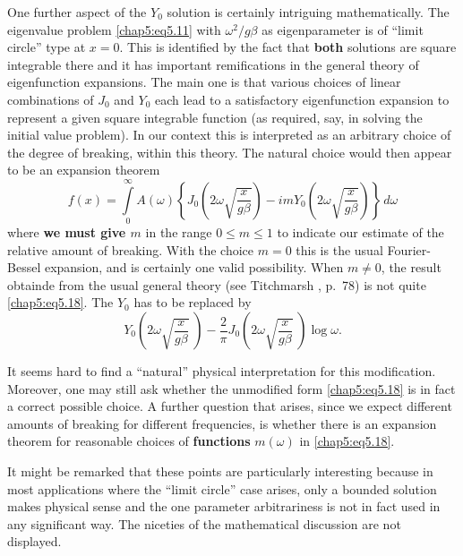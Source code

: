 One further aspect of the $Y_0$ solution is certainly intriguing mathematically. The eigenvalue problem \eqref{chap5:eq5.11} with $\omega^2/g\beta$ as eigenparameter is of ``limit circle'' type at $x=0$. This is identified by the fact that {\bf both} solutions are square integrable there and it has important remifications in the general theory of eigenfunction expansions. The main one is that various choices of linear combinations of $J_0$ and $Y_0$ each lead to a satisfactory eigenfunction expansion to represent a given square integrable function (as required, say, in solving the initial value problem). In our context this is interpreted as an arbitrary choice of the degree of breaking, within this theory. The natural choice would then appear to be an expansion theorem
\begin{equation}
f(x)=\int\limits_0^\infty A(\omega)\left\{J_0\left(2\omega \sqrt{\frac{x} {g\beta}}\right)-imY_0\left(2\omega \sqrt{\frac{x}{g\beta}}\right)\right\}\, d\omega\tag{5.18}\label{chap5:eq5.18}
\end{equation}
where {\bf we must give $m$} in the range $0\leq m\leq 1$ to indicate our estimate of the relative amount of breaking. With the choice $m=0$ this is the usual Fourier-Bessel expansion, and is certainly one valid possibility. When $m\neq 0$, the result obtainde from the usual general theory (see Titchmarsh \cite{key2}, p.~78) is not quite \eqref{chap5:eq5.18}. The $Y_0$ has to be replaced by 
\begin{equation}
Y_0\left(2\omega \sqrt{\frac{x}{g\beta}} \; \right)-\frac{2}{\pi}J_0\left(2\omega \sqrt{\frac{x}{g\beta} } \; \right)\log\omega.\tag{5.19}\label{chap5:eq5.19}
\end{equation}\pageoriginale

It seems hard to find a ``natural'' physical interpretation for this modification. Moreover, one may still ask whether the unmodified form \eqref{chap5:eq5.18} is in fact a correct possible choice. A further question that arises, since we expect different amounts of breaking for different frequencies, is whether there is an expansion theorem for reasonable choices of {\bf functions} $m(\omega)$ in \eqref{chap5:eq5.18}.

It might be remarked that these points are particularly interesting because in most applications where the ``limit circle'' case arises, only a bounded solution makes physical sense and the one parameter arbitrariness is not in fact used in any significant way. The niceties of the mathematical discussion are not displayed.

